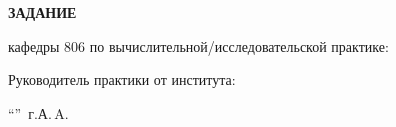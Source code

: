 \begin{center}
\bfseries{\large ЗАДАНИЕ}
\end{center}
кафедры 806 по вычислительной/исследовательской практике:

\vspace*{\fill}
Руководитель практики от института:

\vspace{5pt}
\enquote{\hspace{0.5cm}}  \the\year\,г. А.\,A. 
\pagebreak
